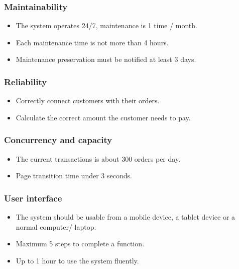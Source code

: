 \documentclass[11pt]{article}
\begin{document}
        \subsubsection*{Maintainability}
        \begin{itemize}
            \item The system operates 24/7, maintenance is 1 time / month.
            \item Each maintenance time is not more than 4 hours.
            \item Maintenance preservation must be notified at least 3 days.
        \end{itemize}
        \subsubsection*{Reliability}
        \begin{itemize}
            \item Correctly connect customers with their orders.
            \item Calculate the correct amount the customer needs to pay.
        \end{itemize}
        \subsubsection*{Concurrency and capacity}
        \begin{itemize}
            \item The current transactions is about 300 orders per day.
            \item Page transition time under 3 seconds.
        \end{itemize}
        \subsubsection*{User interface}
        \begin{itemize}
            \item The system should be usable from a mobile device, a tablet device or a normal computer/ laptop.
            \item Maximum 5 steps to complete a function.
            \item Up to 1 hour to use the system fluently.
        \end{itemize}
\end{document}
